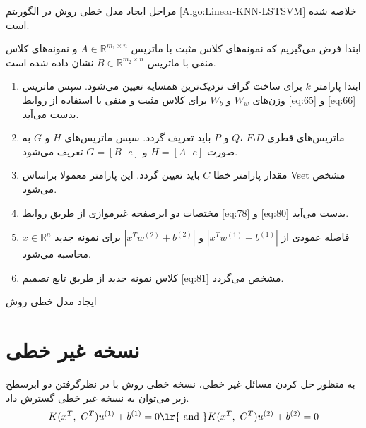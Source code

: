 مراحل ایجاد مدل خطی روش  در الگوریتم \ref{Algo:Linear-KNN-LSTSVM} خلاصه شده است.
\\
\begin{algorithm}[h]
\begin{steps}

 	ابتدا فرض می‌گیریم که نمونه‌های کلاس مثبت با ماتریس  $A\in {{\mathbb{R}}^{{{m}_{1}}\times n}}$ و نمونه‌های کلاس منفی با ماتریس  $B\in {{\mathbb{R}}^{{{m}_{2}}\times n}}$ نشان داده شده است.
 	
 	\begin{enumerate}
 		\item ابتدا پارامتر  $k$ برای ساخت گراف نزدیک‌ترین همسایه تعیین می‌شود. سپس ماتریس وزن‌های  $W_{w}$ و   $W_{b}$ برای کلاس مثبت و منفی با استفاده از روابط \ref{eq:65} و \ref{eq:66} بدست می‌آید.
 		\item ماتریس‌های قطری  $D$،$F$ ،$Q$  و $P$ باید تعریف گردد. سپس ماتریس‌های $H$ و  $G$ به صورت  $H=[A\text{ } e]$ و $G=[B\text{ }e]$  تعریف می‌شود.
 		\item مقدار پارامتر خطا $C$ باید تعیین گردد. این پارامتر معمولا براساس \gls*{Vset} مشخص می‌شود.
 		\item مختصات دو ابرصفحه غیرموازی از طریق روابط \ref{eq:78} و \ref{eq:80} بدست می‌آید.
 		\item فاصله عمودی از $|{{x}^T}{{w}^{(1)}}+{{b}^{(1)}}|$  و  $|{{x}^T}{{w}^{(2)}}+{{b}^{(2)}}|$ برای نمونه جدید   $x \in \mathbb{R}^{n}$ محاسبه می‌شود.
 		\item کلاس نمونه جدید از طریق تابع تصمیم \ref{eq:81} مشخص می‌گردد.
 	\end{enumerate}
\end{steps}
\caption{ ایجاد مدل خطی روش }
\label{Algo:Linear-KNN-LSTSVM}
\end{algorithm}
 
\section{نسخه غیر خطی}\label{sec:3:3}
به منظور حل کردن مسائل غیر خطی، نسخه خطی روش  با در نظرگرفتن دو ابرسطح  زیر می‌توان به نسخه غیر خطی گسترش داد.
\begin{equation}\label{eq:82}
K({{x}^{T}},~{{C}^{T}}){{u}^{\left( 1 \right)}}+{{b}^{\left( 1 \right)}}=0 \text{\lr{ and }} K({{x}^{T}},~{{C}^{T}}){{u}^{\left( 2 \right)}}+{{b}^{\left( 2 \right)}}=0
\end{equation}

